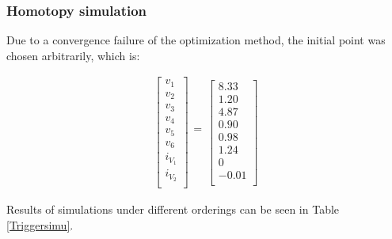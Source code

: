 \documentclass[conference,letterpaper,onecolumn,11pt]{IEEEtran}
\begin{document}
\subsubsection{Homotopy simulation}

Due to a convergence failure of the optimization method, the initial point was chosen arbitrarily, which is:

\begin{displaymath}
\begin{array}{r}
\left[\begin{array}{r}
v_1 \\ v_2  \\ v_3  \\ v_4 \\ v_5  \\ v_6  \\
i_{V_1}  \\ i_{V_2}  \\
\end{array}\right]
\begin{array}{r}
 \\ = \\ \\
\end{array}
\left[\begin{array}{r}
8.33 \\ 1.20  \\ 4.87 \\ 0.90 \\ 0.98 \\ 1.24 \\
0 \\ -0.01 \\
\end{array}\right]
\end{array}
\end{displaymath}

Results of simulations under different orderings can be seen in Table \ref{Triggersimu}.

\begin{table}[!h]
\caption{Simulations using Chao's method for the Schmitt-trigger circuit.}
\label{Triggersimu}
\end{table}
\end{document}
